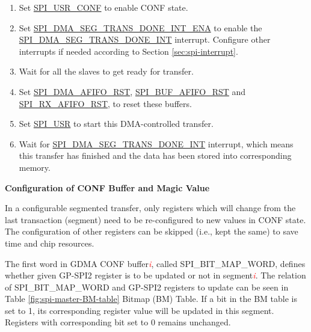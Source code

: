 \documentclass[main\_\_EN.tex]{subfiles}
\begin{document}
\begin{enumerate}
   \item Set \hyperref[fielddesc:SPIUSRCONF]{SPI\_USR\_CONF} to enable CONF state.
   \item Set \hyperref[fielddesc:SPIDMASEGTRANSDONEINTENA]{SPI\_DMA\_SEG\_TRANS\_DONE\_INT\_ENA} to enable the \hyperref[int:SPIDMASEGTRANSDONEINT]{SPI\_DMA\_SEG\_TRANS\_DONE\_INT} interrupt. Configure other interrupts if needed according to Section \ref{sec:spi-interrupt}.

   \item Wait for all the slaves to get ready for transfer.

    \item Set \hyperref[fielddesc:SPIDMAAFIFORST]{SPI\_DMA\_AFIFO\_RST}, \hyperref[fielddesc:SPIBUFAFIFORST]{SPI\_BUF\_AFIFO\_RST} and \hyperref[fielddesc:SPIRXAFIFORST]{SPI\_RX\_AFIFO\_RST}, to reset these buffers.

   \item Set \hyperref[fielddesc:SPIUSR]{SPI\_USR} to start this DMA-controlled transfer.

   \item Wait for \hyperref[int:SPIDMASEGTRANSDONEINT]{SPI\_DMA\_SEG\_TRANS\_DONE\_INT} interrupt, which means this transfer has finished and the data has been stored into corresponding memory.
 \end{enumerate}

\textbf{Configuration of CONF Buffer and Magic Value}\label{sec:SCT-CONF-Buffer}

In a configurable segmented transfer, only registers which will change from the last transaction (segment) need to be re-configured to new values in CONF state. The configuration of other registers can be skipped (i.e., kept the same) to save time and chip resources.

The first word in GDMA CONF buffer\textcolor{red}{\it i}, called SPI\_BIT\_MAP\_WORD, defines whether given GP-SPI2 register is to be updated or not in segment\textcolor{red}{\it i}. The relation of SPI\_BIT\_MAP\_WORD and GP-SPI2 registers to update can be seen in Table \ref{fig:spi-master-BM-table} Bitmap (BM) Table. If a bit in the BM table is set to 1, its corresponding register value will be updated in this segment. Registers with corresponding bit set to 0 remains unchanged.
\end{document}
